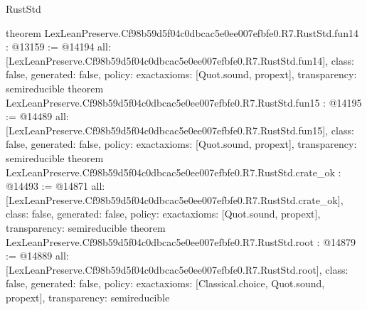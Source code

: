 \begin{lexlean}{RustStd}
\begin{coremodule}
{}
theorem LexLeanPreserve.Cf98b59d5f04c0dbcac5e0ee007efbfe0.R7.RustStd.fun14 : @13159 := @14194 {
  all: [LexLeanPreserve.Cf98b59d5f04c0dbcac5e0ee007efbfe0.R7.RustStd.fun14],
  class: false,
  generated: false,
  policy: exact{axioms: [Quot.sound, propext]},
  transparency: semireducible
}
theorem LexLeanPreserve.Cf98b59d5f04c0dbcac5e0ee007efbfe0.R7.RustStd.fun15 : @14195 := @14489 {
  all: [LexLeanPreserve.Cf98b59d5f04c0dbcac5e0ee007efbfe0.R7.RustStd.fun15],
  class: false,
  generated: false,
  policy: exact{axioms: [Quot.sound, propext]},
  transparency: semireducible
}
theorem LexLeanPreserve.Cf98b59d5f04c0dbcac5e0ee007efbfe0.R7.RustStd.crate_ok : @14493 := @14871 {
  all: [LexLeanPreserve.Cf98b59d5f04c0dbcac5e0ee007efbfe0.R7.RustStd.crate_ok],
  class: false,
  generated: false,
  policy: exact{axioms: [Quot.sound, propext]},
  transparency: semireducible
}
theorem LexLeanPreserve.Cf98b59d5f04c0dbcac5e0ee007efbfe0.R7.RustStd.root : @14879 := @14889 {
  all: [LexLeanPreserve.Cf98b59d5f04c0dbcac5e0ee007efbfe0.R7.RustStd.root],
  class: false,
  generated: false,
  policy: exact{axioms: [Classical.choice, Quot.sound, propext]},
  transparency: semireducible
}


\end{coremodule}
\end{lexlean}
